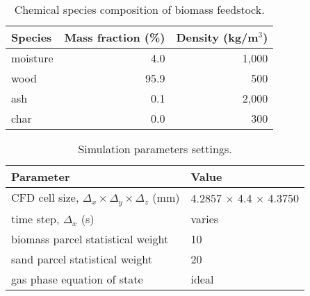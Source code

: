 \begin{table}[H]
    \centering
    \caption{Chemical species composition of biomass feedstock.}
    \begin{tabular}{lrr}
        \toprule
        Species & Mass fraction (\%) & Density (kg/m$^3$) \\
        \midrule
        moisture & 4.0  & 1,000 \\
        wood     & 95.9 & 500 \\
        ash      & 0.1  & 2,000 \\
        char     & 0.0  & 300 \\
        \bottomrule
    \end{tabular}
\end{table}

\begin{table}[H]
    \centering
    \caption{Simulation parameters settings.}
    \begin{tabular}{ll}
        \toprule
        Parameter & Value \\
        \midrule
        CFD cell size, $\Delta_x \times \Delta_y \times \Delta_z$ (mm) & 4.2857 $\times$ 4.4 $\times$ 4.3750 \\
        time step, $\Delta_x$ (s) & varies \\
        biomass parcel statistical weight & 10 \\
        sand parcel statistical weight & 20 \\
        gas phase equation of state & ideal \\
        \bottomrule
    \end{tabular}
\end{table}
